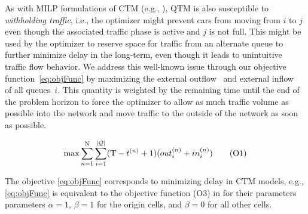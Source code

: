 As with MILP formulations of CTM (e.g., ), QTM is also
susceptible to \emph{withholding traffic}, i.e., the optimizer might prevent
cars from moving from $i$ to $j$ even though the associated traffic phase is
active and $j$ is not full.
%
This might be used by the optimizer to reserve space for traffic from an
alternate queue to further minimize delay in the long-term, even though it leads
to unintuitive traffic flow behavior.
%
We address this well-known issue through our objective
function~\eqref{eq:objFunc} by maximizing the external outflow~
%
%
and external inflow~ of all queues~$i$.
%
This quantity is weighted by the remaining time until the end of the problem
horizon \TMAX to force the optimizer to allow as much traffic volume as possible
into the network and move traffic to the outside of the network as soon as
possible.


\begin{equation}
\max 
 \sum_{n=1}^{\mathrm{N}} \sum_{i=1}^{|\mathcal{\mathcal{Q}}|} (\mathrm{T} - t^{(n)} + 1) (out_{i}^{(n)} + in_{i}^{(n)})
\tag{O1}\label{eq:objFunc}
\end{equation}




The objective \eqref{eq:objFunc} corresponds to minimizing delay in CTM models,
e.g., \eqref{eq:objFunc} is equivalent to the objective function (O3) in
 for their parameters
parameters $\alpha = 1$, $\beta = 1$ for the origin cells, and
$\beta = 0$ for all other cells.

%
%



